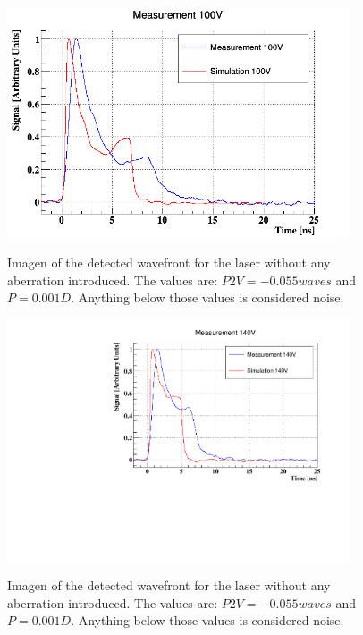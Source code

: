 \begin{figure}[h]
	\centering
	\includegraphics[width=0.9\textwidth]{100V.png}
	\label{fig:mues2}
	\caption{Imagen of the detected wavefront for the laser without any aberration introduced. The values are: $P2V = -0.055waves$ and $P = 0.001D$. Anything below those values is considered noise.}
\end{figure}

\begin{figure}[h]
	\centering
	\includegraphics[width=0.9\textwidth]{140V.png}
	\label{fig:mues2}
	\caption{Imagen of the detected wavefront for the laser without any aberration introduced. The values are: $P2V = -0.055waves$ and $P = 0.001D$. Anything below those values is considered noise.}
\end{figure}

